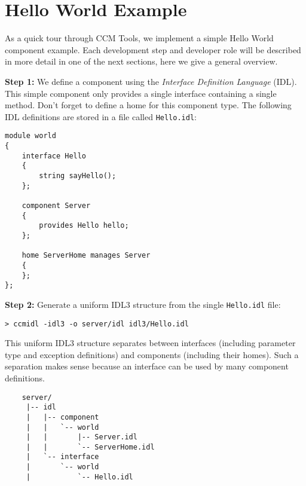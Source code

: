 \chapter{Hello World Example}
\label{HelloWorldComponent}

As a quick tour through CCM Tools, we implement a simple Hello World 
component example. 
Each development step and developer role will be described 
in more detail in one of the next sections, here we give a general overview.

\vspace{5mm}
\noindent
{\bf Step 1:} We define a component using the 
{\it Interface Definition Language} (IDL). 
This simple component only provides a single interface containing a single
method. Don't forget to define a home for this component type.
The following IDL definitions are stored in
a file called {\tt Hello.idl}:
\begin{small}
\begin{verbatim}
module world
{ 
    interface Hello 
    { 
        string sayHello(); 
    }; 

    component Server 
    { 
        provides Hello hello;
    }; 

    home ServerHome manages Server
    {
    };
};
\end{verbatim}
\end{small}


\noindent
{\bf Step 2:} Generate a uniform IDL3 structure from the single {\tt Hello.idl}
file:
\begin{small}
\begin{verbatim}
> ccmidl -idl3 -o server/idl idl3/Hello.idl
\end{verbatim}
\end{small}

\noindent
This uniform IDL3 structure separates between interfaces (including 
parameter type and exception definitions) and components (including their
homes). Such a separation makes sense because an interface can be used by
many component definitions.
\begin{small}
\begin{verbatim}
    server/
     |-- idl
     |   |-- component
     |   |   `-- world
     |   |       |-- Server.idl
     |   |       `-- ServerHome.idl
     |   `-- interface
     |       `-- world
     |           `-- Hello.idl
\end{verbatim}
\end{small}


